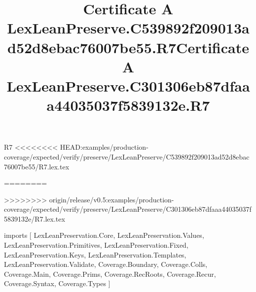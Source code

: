 \begin{lexlean}{R7}
<<<<<<<< HEAD:examples/production-coverage/expected/verify/preserve/LexLeanPreserve/C539892f209013ad52d8ebac76007be55/R7.lex.tex
\title{Certificate A LexLeanPreserve.C539892f209013ad52d8ebac76007be55.R7}
========
\title{Certificate A LexLeanPreserve.C301306eb87dfaaa44035037f5839132e.R7}
>>>>>>>> origin/release/v0.5:examples/production-coverage/expected/verify/preserve/LexLeanPreserve/C301306eb87dfaaa44035037f5839132e/R7.lex.tex
\begin{coremodule}
imports [
  LexLeanPreservation.Core,
  LexLeanPreservation.Values,
  LexLeanPreservation.Primitives,
  LexLeanPreservation.Fixed,
  LexLeanPreservation.Keys,
  LexLeanPreservation.Templates,
  LexLeanPreservation.Validate,
  Coverage.Boundary,
  Coverage.Colls,
  Coverage.Main,
  Coverage.Prims,
  Coverage.RecRoots,
  Coverage.Recur,
  Coverage.Syntax,
  Coverage.Types
]


\end{coremodule}
\end{lexlean}
